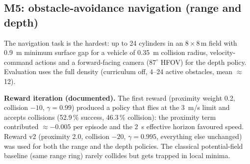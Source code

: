 \documentclass[11pt,a4paper]{article}
\begin{document}
\subsection{M5: obstacle-avoidance navigation (range and depth)}
The navigation task is the hardest: up to 24 cylinders in an $8\times8$\,m field with \SI{0.9}{m} minimum surface
gap for a vehicle of \SI{0.35}{m} collision radius, velocity-command actions and a forward-facing camera
($87^\circ$ HFOV) for the depth policy. Evaluation uses the full density (curriculum off, 4--24 active obstacles,
mean $\approx$12).

\textbf{Reward iteration (documented).} The first reward (proximity weight 0.2, collision $-10$, $\gamma=0.99$)
produced a policy that flies at the \SI{3}{m/s} limit and accepts collisions (52.9\,\% success, 46.3\,\% collision):
the proximity term contributed $\approx-0.005$ per episode and the \SI{2}{s} effective horizon favoured speed.
Reward v2 (proximity 2.0, collision $-20$, $\gamma=0.995$, everything else unchanged) was used for both the range and
the depth policies. The classical potential-field baseline (same range ring) rarely collides but gets trapped in
local minima.
\end{document}
